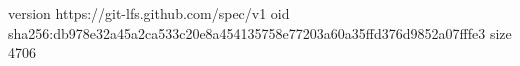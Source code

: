 version https://git-lfs.github.com/spec/v1
oid sha256:db978e32a45a2ca533c20e8a454135758e77203a60a35ffd376d9852a07fffe3
size 4706
